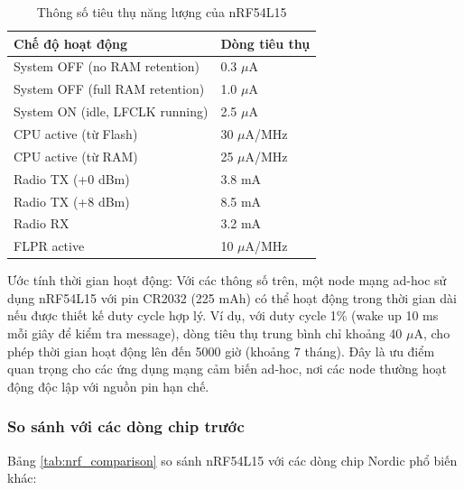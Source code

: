\begin{table}[h!]
\centering
\caption{Thông số tiêu thụ năng lượng của nRF54L15}
\label{tab:nrf54l15_power}
\begin{tabular}{|l|l|}
\hline
\textbf{Chế độ hoạt động} & \textbf{Dòng tiêu thụ} \\
\hline
System OFF (no RAM retention) & 0.3 $\mu$A \\
\hline
System OFF (full RAM retention) & 1.0 $\mu$A \\
\hline
System ON (idle, LFCLK running) & 2.5 $\mu$A \\
\hline
CPU active (từ Flash) & 30 $\mu$A/MHz \\
\hline
CPU active (từ RAM) & 25 $\mu$A/MHz \\
\hline
Radio TX (+0 dBm) & 3.8 mA \\
\hline
Radio TX (+8 dBm) & 8.5 mA \\
\hline
Radio RX & 3.2 mA \\
\hline
FLPR active & 10 $\mu$A/MHz \\
\hline
\end{tabular}
\end{table}

Ước tính thời gian hoạt động: Với các thông số trên, một node mạng ad-hoc sử dụng nRF54L15 với pin CR2032 (225 mAh) có thể hoạt động trong thời gian dài nếu được thiết kế duty cycle hợp lý. Ví dụ, với duty cycle 1\% (wake up 10 ms mỗi giây để kiểm tra message), dòng tiêu thụ trung bình chỉ khoảng 40 $\mu$A, cho phép thời gian hoạt động lên đến 5000 giờ (khoảng 7 tháng). Đây là ưu điểm quan trọng cho các ứng dụng mạng cảm biến ad-hoc, nơi các node thường hoạt động độc lập với nguồn pin hạn chế.


\subsubsection{So sánh với các dòng chip trước}

Bảng \ref{tab:nrf_comparison} so sánh nRF54L15 với các dòng chip Nordic phổ biến khác:


